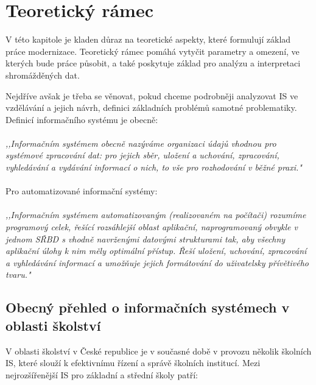 \documentclass[FM,Proj]{tulthesis}
\begin{document}
\chapter{Teoretický rámec}
V této kapitole je kladen důraz na teoretické aspekty, které formulují základ práce 
modernizace. Teoretický rámec pomáhá vytyčit parametry a omezení, ve kterých bude 
práce působit, a také poskytuje základ pro analýzu a interpretaci shromážděných dat. 

Nejdříve avšak je třeba se věnovat, pokud chceme podrobněji analyzovat IS ve vzdělávání 
a jejich návrh, definici základních problémů samotné problematiky. Definicí 
informačního systému je obecně:
\\\\
\textit{,,Informačním systémem obecně nazýváme organizaci údajů vhodnou pro systémové 
zpracování dat: pro jejich sběr, uložení a uchování, zpracování, vyhledávání a vydávání 
informací o nich, to vše pro rozhodování v běžné praxi."}\cite{Sarmanova2008ISaDS}
\\\\
Pro automatizované informační systémy:
\\\\
\textit{,,Informačním systémem automatizovaným (realizovaném na počítači) rozumíme programový 
celek, řešící rozsáhlejší oblast aplikační, naprogramovaný obvykle v jednom SŘBD s 
vhodně navrženými datovými strukturami tak, aby všechny aplikační úlohy k nim měly optimální 
přístup. Řeší uložení, uchování, zpracování a vyhledávání informací a umožňuje jejich 
formátování do uživatelsky přívětivého tvaru."}\cite{Sarmanova2008ISaDS}

\section{Obecný přehled o informačních systémech v oblasti školství}
V oblasti školství v České republice je v současné době v provozu několik školních 
IS, které slouží k efektivnímu řízení a správě školních institucí. 
Mezi nejrozšířenější IS pro základní a střední školy patří:

\end{document}
